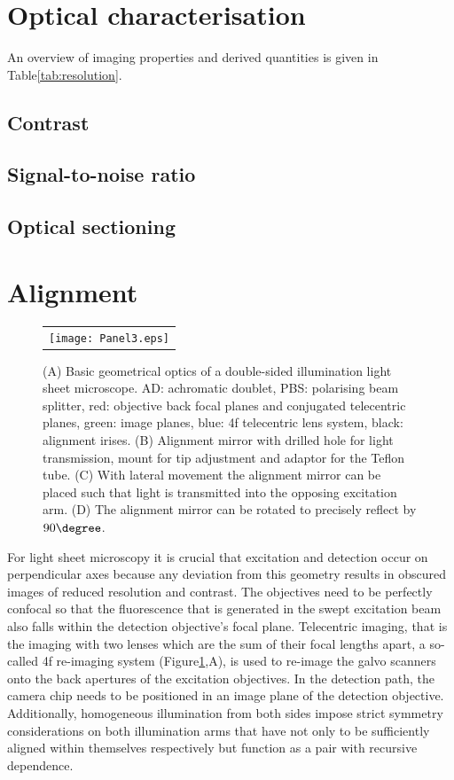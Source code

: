 \documentclass[12pt]{spieman}  %
\begin{document}
\section{Optical characterisation}
An overview of imaging properties and derived quantities is given in Table\ref{tab:resolution}.	
	
	\subsection{Contrast}
	\subsection{Signal-to-noise ratio}
	\subsection{Optical sectioning}	
	
\section{Alignment}

\begin{figure}
   \begin{center}
   \begin{tabular}{c}
   \texttt{[image: Panel3.eps]}
   \end{tabular}
   \end{center}
   \caption{\label{fig:alignment} (A) Basic geometrical optics of a double-sided illumination light sheet microscope. AD: achromatic doublet, PBS: polarising beam splitter, red: objective back focal planes and conjugated telecentric planes, green: image planes, blue: 4f telecentric lens system, black: alignment irises. (B) Alignment mirror with drilled hole for light transmission, mount for tip adjustment and adaptor for the Teflon tube. (C) With lateral movement the alignment mirror can be placed such that light is transmitted into the opposing excitation arm. (D) The alignment mirror can be rotated to precisely reflect by $90\degree$.} 
   \end{figure}

For light sheet microscopy it is crucial that excitation and detection occur on perpendicular axes because any deviation from this geometry results in obscured images of reduced resolution and contrast. The objectives need to be perfectly confocal so that the fluorescence that is generated in the swept excitation beam also falls within the detection objective's focal plane. Telecentric imaging, that is the imaging with two lenses which are the sum of their focal lengths apart, a so-called 4f re-imaging system (Figure\ref{fig:alignment},A), is used to re-image the galvo scanners onto the back apertures of the excitation objectives. In the detection path, the camera chip needs to be positioned in an image plane of the detection objective. Additionally, homogeneous illumination from both sides impose strict symmetry considerations on both illumination arms that have not only to be sufficiently aligned within themselves respectively but function as a pair with recursive dependence. 
\end{document}
